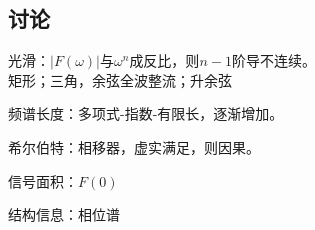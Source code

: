 \subsection{讨论}
光滑：\(|F(\omega)|\)与\(\omega^{n}\)成反比，则\(n-1\)阶导不连续。\\
矩形；三角，余弦全波整流；升余弦

频谱长度：多项式-指数-有限长，逐渐增加。

希尔伯特：相移器，虚实满足，则因果。

信号面积：\(F(0)\)

结构信息：相位谱